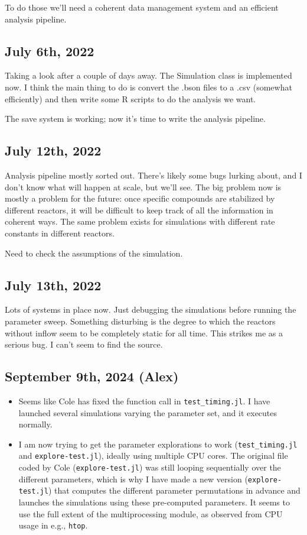 \documentclass[11pt]{article}
\begin{document}
To do those we'll need a coherent data management system and an efficient analysis pipeline.

\subsection{July 6th, 2022}

Taking a look after a couple of days away. The Simulation class is implemented now. I think the main thing to do is convert the .bson files to a .csv (somewhat efficiently) and then write some R scripts to do the analysis we want.

The save system is working; now it's time to write the analysis pipeline.

\subsection{July 12th, 2022}

Analysis pipeline mostly sorted out. There's likely some bugs lurking about, and I don't know what will happen at scale, but we'll see. The big problem now is mostly a problem for the future: once specific compounds are stabilized by different reactors, it will be difficult to keep track of all the information in coherent ways. The same problem exists for simulations with different rate constants in different reactors.

Need to check the assumptions of the simulation.

\subsection{July 13th, 2022}

Lots of systems in place now. Just debugging the simulations before running the parameter sweep. Something disturbing is the degree to which the reactors without inflow seem to be completely static for all time. This strikes me as a serious bug. I can't seem to find the source.

\subsection{September 9th, 2024 (Alex)}

\begin{itemize}
    \item Seems like Cole has fixed the function call in \texttt{test\_timing.jl}. I have launched several simulations varying the parameter set, and it executes normally.
    \item I am now trying to get the parameter explorations to work (\texttt{test\_timing.jl} and \texttt{explore-test.jl}), ideally using multiple CPU cores. The original file coded by Cole (\texttt{explore-test.jl}) was still looping sequentially over the different parameters, which is why I have made a new version (\texttt{explore-test.jl}) that computes the different parameter permutations in advance and launches the simulations using these pre-computed parameters. It seems to use the full extent of the multiprocessing module, as observed from CPU usage in e.g., \texttt{htop}.
\end{itemize}
\end{document}
